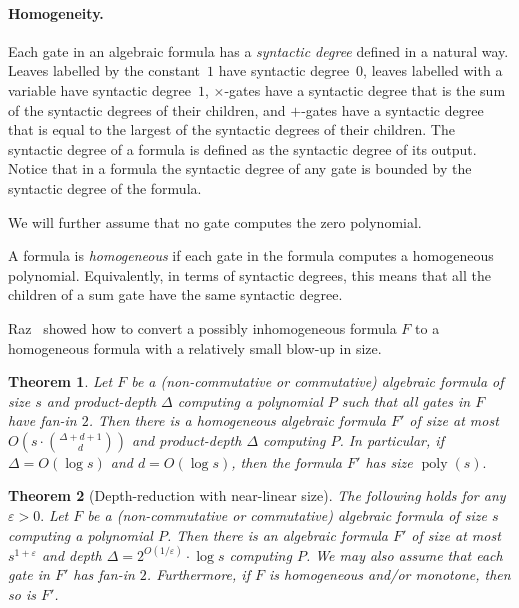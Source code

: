 \documentclass[10pt,a4paper]{article}
\newtheorem{theorem}{Theorem}
\newcommand{\poly}{\mathop{\mathrm{poly}}}
\begin{document}
\paragraph{Homogeneity.} Each gate in an algebraic formula has a \emph{syntactic degree} defined in a natural way. Leaves labelled by the constant~$1$ have syntactic degree~\(0\),  leaves labelled with a variable have syntactic degree~$1$, $\times$-gates have a syntactic degree that is the sum of the syntactic degrees of their children, and $+$-gates have a syntactic degree that is equal to the largest of the syntactic degrees of their children.
 The syntactic degree of a formula is defined as the syntactic degree of its output. Notice that in a formula  the syntactic degree of any gate is bounded by the syntactic degree of the formula. 

We will further assume that no gate computes the zero polynomial.

A formula is \emph{homogeneous} if each gate in the formula computes a homogeneous polynomial. Equivalently, in terms of syntactic degrees, this means that all the children of a sum gate have the same syntactic degree.

Raz~\cite{Raztensor} showed how to convert a possibly inhomogeneous formula $F$ to a homogeneous formula with a relatively small blow-up in size.

\begin{theorem}
\label{thm:Raz}
 Let $F$ be a (non-commutative or commutative) algebraic formula of size $s$ and product-depth $\Delta$ computing a polynomial $P$ such that all gates in $F$ have fan-in $2$. Then there is a \emph{homogeneous} algebraic formula $F'$ of size at most $O\left(s\cdot \binom{\Delta + d+1}{d}\right)$ and product-depth $\Delta$ computing $P$.  In particular, if $\Delta = O(\log s)$ and $d = O(\log s)$, then the formula $F'$ has size $\poly(s).$
\end{theorem}



\begin{theorem}[Depth-reduction with near-linear size]
	\label{thm:BCE}
	The following holds for any $\varepsilon > 0.$ Let $F$ be a (non-commutative or commutative) algebraic formula of size $s$ computing a polynomial $P$. Then there is an algebraic formula $F'$ of size at most $s^{1+\varepsilon}$ and depth $\Delta = 2^{O(1/\varepsilon)}\cdot \log s$ computing $P$. We may also assume that each gate in $F'$ has fan-in $2$. Furthermore, if $F$ is homogeneous and/or monotone, then so is $F'$.
\end{theorem}
\end{document}
